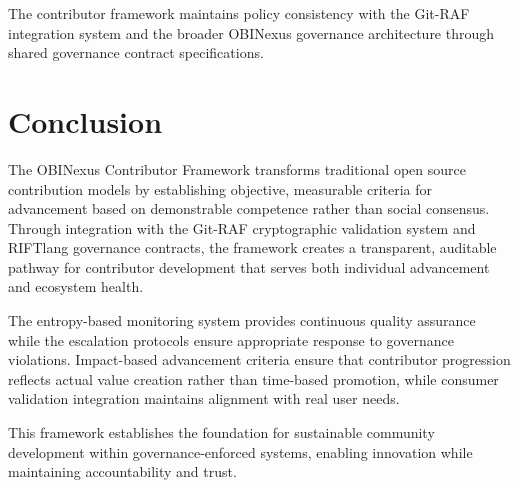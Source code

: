 The contributor framework maintains policy consistency with the Git-RAF integration system and the broader OBINexus governance architecture through shared governance contract specifications.

\section*{Conclusion}

The OBINexus Contributor Framework transforms traditional open source contribution models by establishing objective, measurable criteria for advancement based on demonstrable competence rather than social consensus. Through integration with the Git-RAF cryptographic validation system and RIFTlang governance contracts, the framework creates a transparent, auditable pathway for contributor development that serves both individual advancement and ecosystem health.

The entropy-based monitoring system provides continuous quality assurance while the escalation protocols ensure appropriate response to governance violations. Impact-based advancement criteria ensure that contributor progression reflects actual value creation rather than time-based promotion, while consumer validation integration maintains alignment with real user needs.

This framework establishes the foundation for sustainable community development within governance-enforced systems, enabling innovation while maintaining accountability and trust.